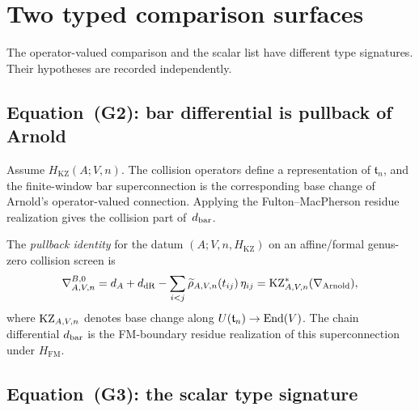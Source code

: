 \section{Two typed comparison surfaces}
\label{sec:climax-platonic-two-equations}

The operator-valued comparison and the scalar list have different
type signatures.  Their hypotheses are recorded independently.

\subsection{Equation~(G2): bar differential is pullback of Arnold}
\label{ssec:climax-platonic-equation-g2}

Assume $H_{\mathrm{KZ}}(A;V,n)$.  The collision operators define a
representation of $\mathfrak t_n$, and the finite-window bar
superconnection is the corresponding base change of Arnold's
operator-valued connection.  Applying the Fulton--MacPherson residue
realization gives the collision part of~$d_{\mathrm{bar}}$.

\begin{definition}
\label{def:pullback-identity-structural-platonic}
The \emph{pullback identity} for the datum $(A;V,n,H_{\mathrm{KZ}})$
on an affine/formal genus-zero collision screen is
\begin{equation}
\label{eq:climax-equation-G2}
\nabla^{B,0}_{A,V,n}
=d_A+d_{\mathrm{dR}}
-\sum_{i<j}\widetilde\rho_{A,V,n}(t_{ij})\,\eta_{ij}
=\mathrm{KZ}_{A,V,n}^{*}(\nabla_{\mathrm{Arnold}}),
\end{equation}
where $\mathrm{KZ}_{A,V,n}$ denotes base change along
$U(\mathfrak t_n)\to\mathrm{End}(V)$.  The chain differential $d_{\mathrm{bar}}$ is the
FM-boundary residue realization of this superconnection under
$H_{\mathrm{FM}}$.
\end{definition}

\subsection{Equation~(G3): the scalar type signature}
\label{ssec:climax-platonic-equation-g3}

